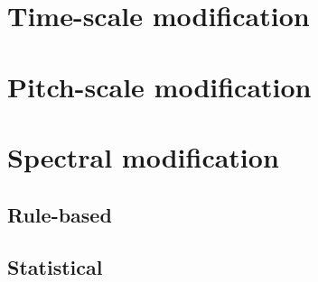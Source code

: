 \section{Time-scale modification} %
\label{sec:time_scale_modification}


\section{Pitch-scale modification} %
\label{sec:pitch_scale_modification}


\section{Spectral modification} %
\label{sec:spectral_modification}

\subsection{Rule-based} %
\label{sub:rule_based}


\subsection{Statistical} %
\label{sub:statistical}

